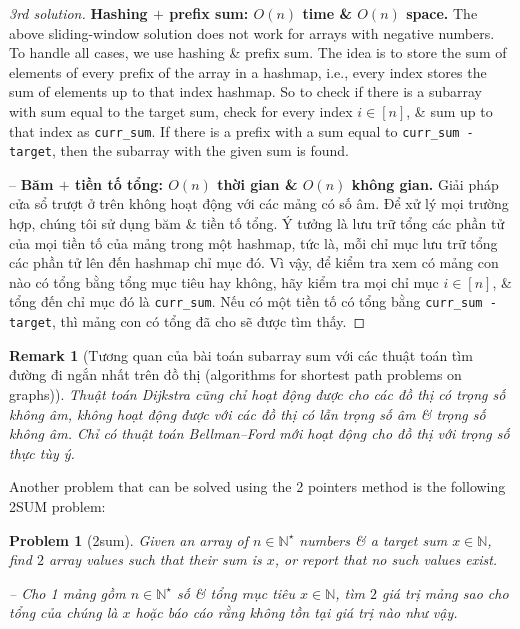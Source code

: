 \documentclass{article}
\newtheorem{problem}{Problem}
\newtheorem{remark}{Remark}
\begin{document}
\begin{proof}[3rd solution]
    {\bf Hashing $+$ prefix sum: $O(n)$ time \& $O(n)$ space.} The above sliding-window solution does not work for arrays with negative numbers. To handle all cases, we use hashing \& prefix sum. The idea is to store the sum of elements of every prefix of the array in a hashmap, i.e., every index stores the sum of elements up to that index hashmap. So to check if there is a subarray with sum equal to the target sum, check for every index $i\in[n]$, \& sum up to that index as \verb|curr_sum|. If there is a prefix with a sum equal to \verb|curr_sum - target|, then the subarray with the given sum is found.

    -- {\bf Băm $+$ tiền tố tổng: $O(n)$ thời gian \& $O(n)$ không gian.} Giải pháp cửa sổ trượt ở trên không hoạt động với các mảng có số âm. Để xử lý mọi trường hợp, chúng tôi sử dụng băm \& tiền tố tổng. Ý tưởng là lưu trữ tổng các phần tử của mọi tiền tố của mảng trong một hashmap, tức là, mỗi chỉ mục lưu trữ tổng các phần tử lên đến hashmap chỉ mục đó. Vì vậy, để kiểm tra xem có mảng con nào có tổng bằng tổng mục tiêu hay không, hãy kiểm tra mọi chỉ mục $i\in[n]$, \& tổng đến chỉ mục đó là \verb|curr_sum|. Nếu có một tiền tố có tổng bằng \verb|curr_sum - target|, thì mảng con có tổng đã cho sẽ được tìm thấy.
\end{proof}

\begin{remark}[Tương quan của bài toán subarray sum với các thuật toán tìm đường đi ngắn nhất trên đồ thị (algorithms for shortest path problems on graphs)]
    Thuật toán Dijkstra cũng chỉ hoạt động được cho các đồ thị có trọng số không âm, không hoạt động được với các đồ thị có lẫn trọng số âm \& trọng số không âm. Chỉ có thuật toán Bellman--Ford mới hoạt động cho đồ thị với trọng số thực tùy ý.
\end{remark}
Another problem that can be solved using the 2 pointers method is the following 2SUM problem:

\begin{problem}[2sum]
    Given an array of $n\in\mathbb{N}^\star$ numbers \& a target sum $x\in\mathbb{N}$, find $2$ array values such that their sum is $x$, or report that no such values exist.

    -- Cho 1 mảng gồm $n\in\mathbb{N}^\star$ số \& tổng mục tiêu $x\in\mathbb{N}$, tìm $2$ giá trị mảng sao cho tổng của chúng là $x$ hoặc báo cáo rằng không tồn tại giá trị nào như vậy.
\end{problem}
\end{document}
